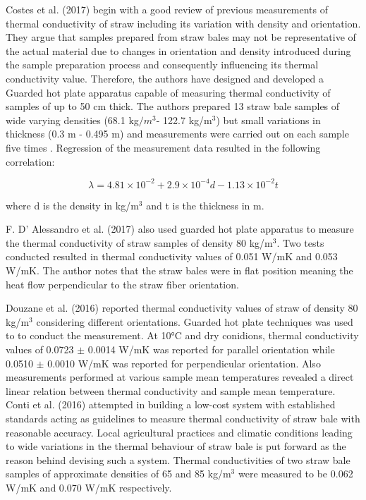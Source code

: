\documentclass[12pt]{report}
\begin{document}
 Costes et al. (2017) begin with a good review of previous measurements
of thermal conductivity of straw including its variation with density
and orientation. They argue that samples prepared from straw bales may
not be representative of the actual material due to changes in
orientation and density introduced during the sample preparation process
and consequently influencing its thermal conductivity value. Therefore,
the authors have designed and developed a Guarded hot plate apparatus
capable of measuring thermal conductivity of samples of up to 50 cm
thick. The authors prepared 13 straw bale samples of wide varying
densities (68.1 kg\(/m^{3}\)- 122.7 kg/m\(^{3}\)) but small variations
in thickness (0.3 m - 0.495 m) and measurements were carried out on each
sample five times . Regression of the measurement data resulted in the
following correlation:

\[\lambda = 4.81 \times 10^{-2} + 2.9 \times 10^{-4} d   -1.13 \times 10^{-2} t\]

where d is the density in kg/m\(^{3}\) and t is the thickness in m.

 F. D' Alessandro et al. (2017) also used guarded hot plate apparatus to
measure the thermal conductivity of straw samples of density 80
kg/m\(^{3}\). Two tests conducted resulted in thermal conductivity
values of 0.051 W/mK and 0.053 W/mK. The author notes that the straw
bales were in flat position meaning the heat flow perpendicular to the
straw fiber orientation.

 Douzane et al. (2016) reported thermal conductivity values of straw of
density 80 kg/m\(^{3}\) considering different orientations. Guarded hot
plate techniques was used to to conduct the measurement. At 10°C and dry
conidions, thermal conductivity values of 0.0723 \(\pm\) 0.0014 W/mK was
reported for parallel orientation while 0.0510 \(\pm\) 0.0010 W/mK was
reported for perpendicular orientation. Also measurements performed at
various sample mean temperatures revealed a direct linear relation
between thermal conductivity and sample mean temperature. \\

 Conti et al. (2016) attempted in building a low-cost system with
established standards acting as guidelines to measure thermal
conductivity of straw bale with reasonable accuracy. Local agricultural
practices and climatic conditions leading to wide variations in the
thermal behaviour of straw bale is put forward as the reason behind
devising such a system. Thermal conductivities of two straw bale samples
of approximate densities of 65 and 85 kg/m\(^{3}\) were measured to be
0.062 W/mK and 0.070 W/mK respectively.
\end{document}
